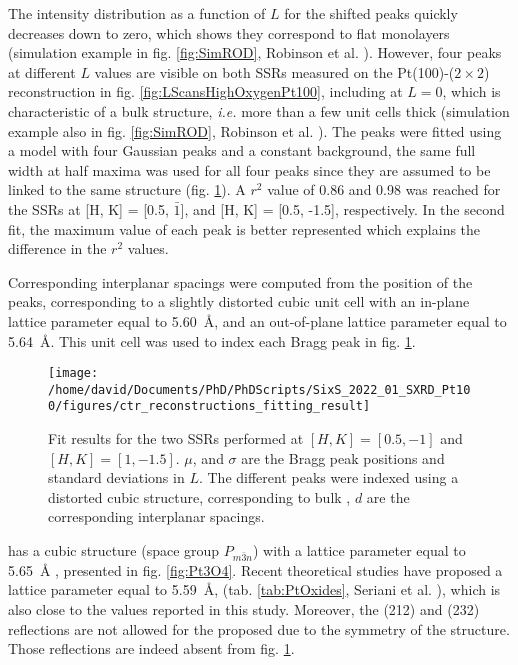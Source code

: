 The intensity distribution as a function of $L$ for the shifted peaks quickly decreases down to zero, which shows they correspond to flat monolayers (simulation example in fig. \ref{fig:SimROD}, Robinson et al. \cite*{Robinson1991}).
However, four peaks at different $L$ values are visible on both SSRs measured on the Pt(100)-($2\times2$) reconstruction in fig. \ref{fig:LScansHighOxygenPt100}, including at $L=0$, which is characteristic of a bulk structure, \textit{i.e.} more than a few unit cells thick (simulation example also in fig. \ref{fig:SimROD}, Robinson et al. \cite*{Robinson1991}).
The peaks were fitted using a model with four Gaussian peaks and a constant background, the same full width at half maxima was used for all four peaks since they are assumed to be linked to the same structure (fig. \ref{fig:FitPt100LScans}).
A $r^2$ value of \num{0.86} and \num{0.98} was reached for the SSRs at [H, K] = [0.5, $\bar{1}$], and [H, K] = [0.5, -1.5], respectively.
In the second fit, the maximum value of each peak is better represented which explains the difference in the $r^2$ values.

Corresponding interplanar spacings were computed from the position of the peaks, corresponding to a slightly distorted cubic unit cell with an in-plane lattice parameter equal to \qty{5.60}{\angstrom}, and an out-of-plane lattice parameter equal to \qty{5.64}{\angstrom}.
This unit cell was used to index each Bragg peak in fig. \ref{fig:FitPt100LScans}.

\begin{figure}[!htb]
    \centering
    \texttt{[image: /home/david/Documents/PhD/PhDScripts/SixS\_2022\_01\_SXRD\_Pt100/figures/ctr\_reconstructions\_fitting\_result]}
    \caption{
        Fit results for the two SSRs performed at $[H, K] = [0.5, -1]$ and $[H, K] = [1, -1.5]$.
        $\mu$, and $\sigma$ are the Bragg peak positions and standard deviations in $L$.
        The different peaks were indexed using a distorted cubic structure, corresponding to bulk , $d$ are the corresponding interplanar spacings.
    }
    \label{fig:FitPt100LScans}
\end{figure}

 has a cubic structure (space group $P_{m\bar{3}n}$) with a lattice parameter equal to \qty{5.65}{\angstrom} \parencite{Galloni1941, Galloni1952, Muller1968}, presented in fig. \ref{fig:Pt3O4}.
Recent theoretical studies have proposed a lattice parameter equal to \qty{5.59}{\angstrom}, (tab. \ref{tab:PtOxides}, Seriani et al. \cite*{Seriani2006}), which is also close to the values reported in this study.
Moreover, the (212) and (232) reflections are not allowed for the proposed due to the symmetry of the  structure.
Those reflections are indeed absent from fig. \ref{fig:FitPt100LScans}.

